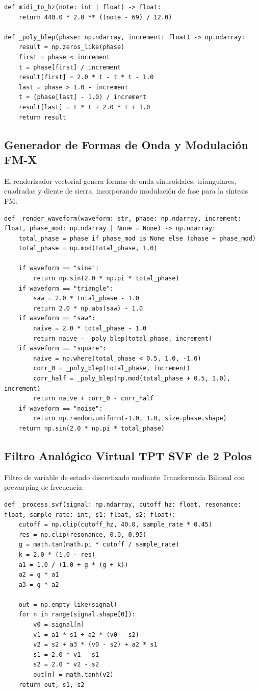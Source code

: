 \documentclass[11pt,a4paper]{article}
\begin{document}
\begin{lstlisting}
def midi_to_hz(note: int | float) -> float:
    return 440.0 * 2.0 ** ((note - 69) / 12.0)

def _poly_blep(phase: np.ndarray, increment: float) -> np.ndarray:
    result = np.zeros_like(phase)
    first = phase < increment
    t = phase[first] / increment
    result[first] = 2.0 * t - t * t - 1.0
    last = phase > 1.0 - increment
    t = (phase[last] - 1.0) / increment
    result[last] = t * t + 2.0 * t + 1.0
    return result
\end{lstlisting}

\subsection{Generador de Formas de Onda y Modulación FM-X}
El renderizador vectorial genera formas de onda sinusoidales, triangulares, cuadradas y diente de sierra, incorporando modulación de fase para la síntesis FM:

\begin{lstlisting}
def _render_waveform(waveform: str, phase: np.ndarray, increment: float, phase_mod: np.ndarray | None = None) -> np.ndarray:
    total_phase = phase if phase_mod is None else (phase + phase_mod)
    total_phase = np.mod(total_phase, 1.0)

    if waveform == "sine":
        return np.sin(2.0 * np.pi * total_phase)
    if waveform == "triangle":
        saw = 2.0 * total_phase - 1.0
        return 2.0 * np.abs(saw) - 1.0
    if waveform == "saw":
        naive = 2.0 * total_phase - 1.0
        return naive - _poly_blep(total_phase, increment)
    if waveform == "square":
        naive = np.where(total_phase < 0.5, 1.0, -1.0)
        corr_0 = _poly_blep(total_phase, increment)
        corr_half = _poly_blep(np.mod(total_phase + 0.5, 1.0), increment)
        return naive + corr_0 - corr_half
    if waveform == "noise":
        return np.random.uniform(-1.0, 1.0, size=phase.shape)
    return np.sin(2.0 * np.pi * total_phase)
\end{lstlisting}

\subsection{Filtro Analógico Virtual TPT SVF de 2 Polos}
Filtro de variable de estado discretizado mediante Transformada Bilineal con prewarping de frecuencia:

\begin{lstlisting}
def _process_svf(signal: np.ndarray, cutoff_hz: float, resonance: float, sample_rate: int, s1: float, s2: float):
    cutoff = np.clip(cutoff_hz, 40.0, sample_rate * 0.45)
    res = np.clip(resonance, 0.0, 0.95)
    g = math.tan(math.pi * cutoff / sample_rate)
    k = 2.0 * (1.0 - res)
    a1 = 1.0 / (1.0 + g * (g + k))
    a2 = g * a1
    a3 = g * a2

    out = np.empty_like(signal)
    for n in range(signal.shape[0]):
        v0 = signal[n]
        v1 = a1 * s1 + a2 * (v0 - s2)
        v2 = s2 + a3 * (v0 - s2) + a2 * s1
        s1 = 2.0 * v1 - s1
        s2 = 2.0 * v2 - s2
        out[n] = math.tanh(v2)
    return out, s1, s2
\end{lstlisting}
\end{document}
